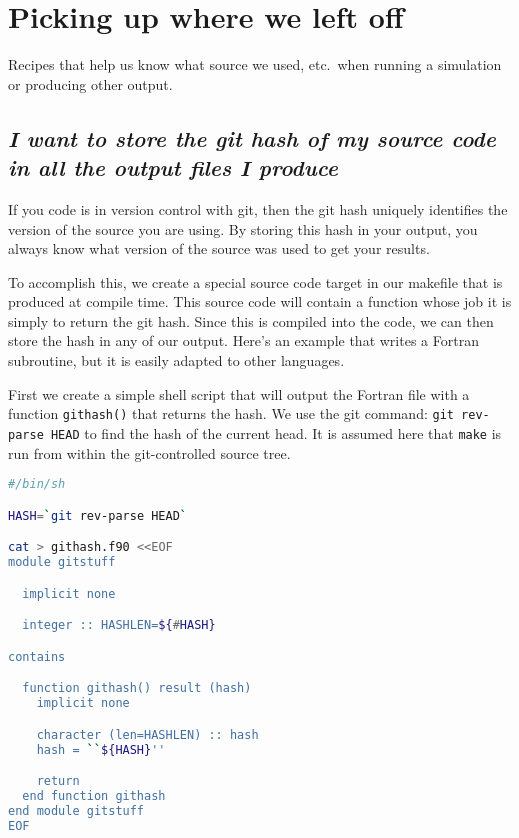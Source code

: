 \section{Picking up where we left off}

Recipes that help us know what source we used, etc.\ when running
a simulation or producing other output.


\subsection{\em I want to store the git hash of my source code in all the output files I produce}

If you code is in version control with git, then the git hash uniquely
identifies the version of the source you are using.  By storing this
hash in your output, you always know what version of the source was
used to get your results.

To accomplish this, we create a special source code target in our
makefile that is produced at compile time.  This source code will
contain a function whose job it is simply to return the git hash.
Since this is compiled into the code, we can then store the hash in
any of our output.  Here's an example that writes a Fortran
subroutine, but it is easily adapted to other languages.

First we create a simple shell script that will output the
Fortran file with a function {\tt githash()} that returns
the hash.  We use the git command: {\tt git rev-parse HEAD}
to find the hash of the current head.  It is assumed here
that {\tt make} is run from within the git-controlled
source tree.

\begin{lstlisting}[language={bash},upquote=true]
#/bin/sh

HASH=`git rev-parse HEAD`

cat > githash.f90 <<EOF
module gitstuff

  implicit none

  integer :: HASHLEN=${#HASH}

contains

  function githash() result (hash)
    implicit none

    character (len=HASHLEN) :: hash
    hash = ``${HASH}''

    return
  end function githash
end module gitstuff
EOF  
\end{lstlisting}


